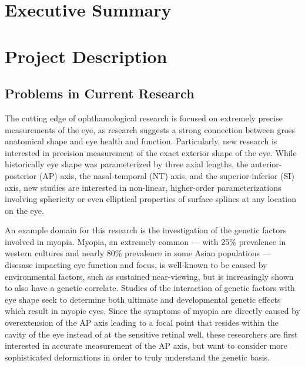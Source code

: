 \documentclass{article}
\begin{document}

\setcounter{tocdepth}{2}
\tableofcontents
\newpage
\section{Executive Summary}
\label{sec:exec-summary}

\section{Project Description}
\label{sec:project-description}

\subsection{Problems in Current Research}
\label{sec:probl-curr-rese}

The cutting edge of ophthamological research is focused on extremely precise measurements of the eye, as research suggests a strong connection between gross anatomical shape and eye health and function. Particularly, new research is interested in precision measurement of the exact exterior shape of the eye\cite{atchison04,zhou99:genes,zhou99:models,guggenheim04,wallman04}. While historically eye shape was parameterized by three axial lengths, the anterior-posterior (AP) axis, the nasal-temporal (NT) axis, and the superior-inferior (SI) axis, new studies are interested in non-linear, higher-order parameterizations involving sphericity or even elliptical properties of surface splines at any location on the eye.

An example domain for this research is the investigation of the genetic factors involved in myopia. Myopia, an extremely common --- with 25\% prevalence in western cultures and nearly 80\% prevalence in some Asian populations\cite{rajan98} --- disesase impacting eye function and focus, is well-known to be caused by environmental factors, such as sustained near-viewing, but is increasingly shown to also have a genetic correlate\cite{zhou99:genes,zhou99:models,schmucker04}. Studies of the interaction of genetic factors with eye shape seek to determine both ultimate and developmental genetic effects which result in myopic eyes. Since the symptoms of myopia are directly caused by overextension of the AP axis leading to a focal point that resides within the cavity of the eye instead of at the sensitive retinal well, these researchers are first interested in accurate measurement of the AP axis\cite{wallman04}, but want to consider more sophisticated deformations in order to truly understand the genetic basis\cite{schaeffel04}.
\end{document}
